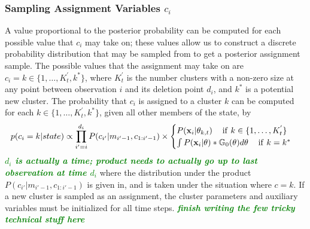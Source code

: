 \documentclass[smallcondensed, final]{svjour3}
\newcommand{\willie}[1]{\textcolor{green}{\textsf{\emph{\textbf{\textcolor{green}{#1}}}}}}
\begin{document}
\subsubsection{Sampling Assignment Variables $c_{i}$}
\label{sec:sample_assignments}

A value proportional to the posterior probability can be computed for each possible value that $c_{i}$ may take on; these values allow us to construct a discrete probability distribution that may be sampled from to get a posterior assignment sample. The possible values that the assignment may take on are $c_{i} = k \in \{ 1 , \ldots ,  K_{t}^{'}, k^{*}\}$, where $K_{t}^{'}$ is the number clusters with a non-zero size at any point between observation $i$ and its deletion point $d_{i}$, and $k^{*}$ is a potential new cluster. The probability that $c_{i}$ is assigned to a cluster $k$ can be computed for each $k \in \{ 1 , \ldots ,  K_{t}^{'}, k^{*} \}$, given all other members of the state, by
\begin{equation}
p(c_{i} = k | state) \propto \prod_{i' = i}^{d_{i}} P(c_{i'} | m_{i'-1}, c_{1:i'-1}) \newline \times
\begin{cases}
	P(\bold{x}_{i} | \theta_{k,t})                                        \hspace{12pt} \text{if} \hspace{4pt} k \in \{ 1, \ldots, K_{t}^{'} \} \\
	\int P(\bold{x}_{i} | \theta) * \mathbb{G}_{0}(\theta) d\theta    \hspace{12pt} \text{if}  \hspace{4pt}  k = k^{*}
\end{cases}
\end{equation}
\willie{$d_{i}$ is actually a time; product needs to actually go up to last observation at time $d_{i}$} where the distribution under the product $P(c_{i'} | m_{i'-1}, c_{1:i'-1})$ is given in, and is taken under the situation where $c = k$. If a new cluster is sampled as an assignment, the cluster parameters and auxiliary variables must be initialized for all time steps. \willie{finish writing the few tricky technical stuff here}
\end{document}
